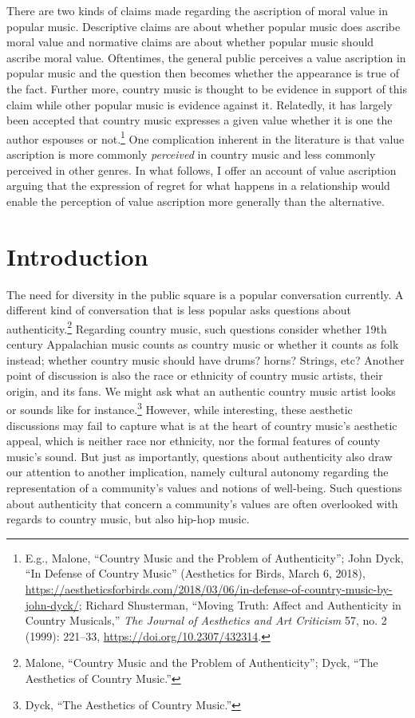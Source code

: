 \documentclass[phdthesis,12pt,final]{wuthesis}
\theoremstyle{definition}
\theoremstyle{definition}
\theoremstyle{definition}
\theoremstyle{definition}
\theoremstyle{remark}
\begin{document}
There are two kinds of claims made regarding the ascription of moral value in popular music. Descriptive claims are about whether popular music does ascribe moral value and normative claims are about whether popular music should ascribe moral value. Oftentimes, the general public perceives a value ascription in popular music and the question then becomes whether the appearance is true of the fact. Further more, country music is thought to be evidence in support of this claim while other popular music is evidence against it. Relatedly, it has largely been accepted that country music expresses a given value whether it is one the author espouses or not.\footnote{E.g., Malone, {``Country {Music} and the {Problem} of {Authenticity}''}; John Dyck, {``In Defense of Country Music''} (Aesthetics for Birds, March 6, 2018), \url{https://aestheticsforbirds.com/2018/03/06/in-defense-of-country-music-by-john-dyck/}; Richard Shusterman, {``Moving {Truth}: {Affect} and {Authenticity} in {Country Musicals},''} \emph{The Journal of Aesthetics and Art Criticism} 57, no. 2 (1999): 221--33, \url{https://doi.org/10.2307/432314}.} One complication inherent in the literature is that value ascription is more commonly \emph{perceived} in country music and less commonly perceived in other genres. In what follows, I offer an account of value ascription arguing that the expression of regret for what happens in a relationship would enable the perception of value ascription more generally than the alternative.

\section{Introduction}\label{introduction-1}

The need for diversity in the public square is a popular conversation currently. A different kind of conversation that is less popular asks questions about authenticity.\footnote{Malone, {``Country {Music} and the {Problem} of {Authenticity}''}; Dyck, {``The Aesthetics of Country Music.''}} Regarding country music, such questions consider whether 19th century Appalachian music counts as country music or whether it counts as folk instead; whether country music should have drums? horns? Strings, etc? Another point of discussion is also the race or ethnicity of country music artists, their origin, and its fans. We might ask what an authentic country music artist looks or sounds like for instance.\footnote{Dyck, {``The Aesthetics of Country Music.''}} However, while interesting, these aesthetic discussions may fail to capture what is at the heart of country music's aesthetic appeal, which is neither race nor ethnicity, nor the formal features of county music's sound. But just as importantly, questions about authenticity also draw our attention to another implication, namely cultural autonomy regarding the representation of a community's values and notions of well-being. Such questions about authenticity that concern a community's values are often overlooked with regards to country music, but also hip-hop music.
\end{document}
